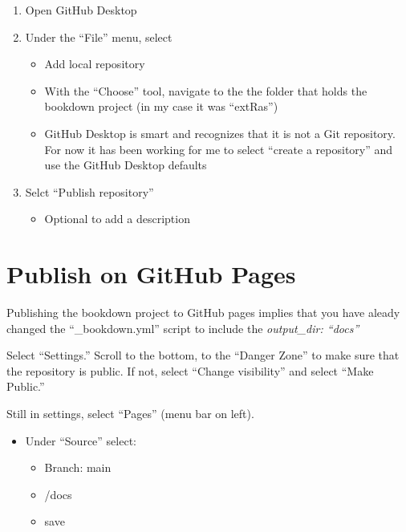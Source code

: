 \documentclass[
]{book}
\providecommand{\tightlist}{%
  \setlength{\itemsep}{0pt}\setlength{\parskip}{0pt}}
\begin{document}
\begin{enumerate}
\def\labelenumi{\arabic{enumi}.}
\tightlist
\item
  Open GitHub Desktop
\item
  Under the ``File'' menu, select

  \begin{itemize}
  \tightlist
  \item
    Add local repository
  \item
    With the ``Choose'' tool, navigate to the the folder that holds the bookdown project (in my case it was ``extRas'')
  \item
    GitHub Desktop is smart and recognizes that it is not a Git repository. For now it has been working for me to select ``create a repository'' and use the GitHub Desktop defaults
  \end{itemize}
\item
  Selct ``Publish repository''

  \begin{itemize}
  \tightlist
  \item
    Optional to add a description
  \end{itemize}
\end{enumerate}

\hypertarget{publish-on-github-pages}{%
\section{Publish on GitHub Pages}\label{publish-on-github-pages}}

Publishing the bookdown project to GitHub pages implies that you have aleady changed the ``\_bookdown.yml'' script to include the \emph{output\_dir: ``docs''}

Select ``Settings.'' Scroll to the bottom, to the ``Danger Zone'' to make sure that the repository is public. If not, select ``Change visibility'' and select ``Make Public.''

Still in settings, select ``Pages'' (menu bar on left).

\begin{itemize}
\tightlist
\item
  Under ``Source'' select:

  \begin{itemize}
  \tightlist
  \item
    Branch: main
  \item
    /docs
  \item
    save
  \end{itemize}
\end{itemize}
\end{document}
